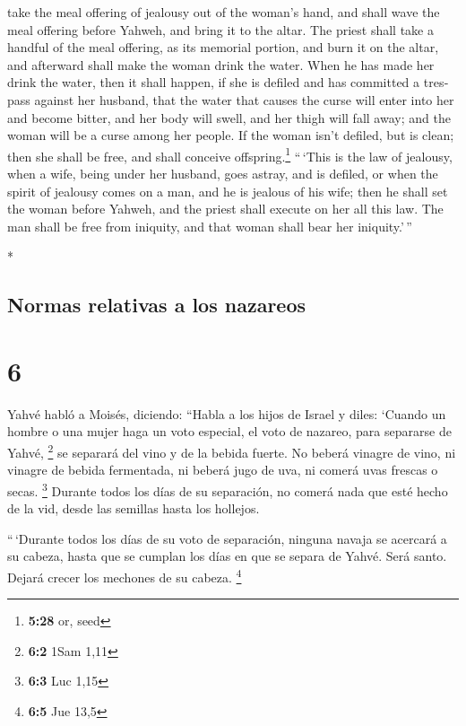 \begin{paracol}{2}
\begin{otherlanguage}{english}
take the meal offering of jealousy out of the woman's hand, and shall
wave the meal offering before Yahweh, and bring it to the altar.
 The priest shall take a handful of the meal offering, as
its memorial portion, and burn it on the altar, and afterward shall make
the woman drink the water.  When he has made her drink
the water, then it shall happen, if she is defiled and has committed a
trespass against her husband, that the water that causes the curse will
enter into her and become bitter, and her body will swell, and her thigh
will fall away; and the woman will be a curse among her people.
 If the woman isn't defiled, but is clean; then she shall
be free, and shall conceive offspring.\footnote{\textbf{5:28} or, seed}
 ``\,`This is the law of jealousy, when a wife, being
under her husband, goes astray, and is defiled,  or when
the spirit of jealousy comes on a man, and he is jealous of his wife;
then he shall set the woman before Yahweh, and the priest shall execute
on her all this law.  The man shall be free from
iniquity, and that woman shall bear her iniquity.'\,''

\end{otherlanguage}

\switchcolumn[0]*

\hypertarget{normas-relativas-a-los-nazareos}{%
\subsection{Normas relativas a los
nazareos}\label{normas-relativas-a-los-nazareos}}

\hypertarget{section-10}{%
\section{6}\label{section-10}}

 Yahvé habló a Moisés, diciendo:  ``Habla a
los hijos de Israel y diles: `Cuando un hombre o una mujer haga un voto
especial, el voto de nazareo, para separarse de Yahvé, \footnote{\textbf{6:2}
  1Sam 1,11}  se separará del vino y de la bebida fuerte.
No beberá vinagre de vino, ni vinagre de bebida fermentada, ni beberá
jugo de uva, ni comerá uvas frescas o secas. \footnote{\textbf{6:3} Luc
  1,15}  Durante todos los días de su separación, no
comerá nada que esté hecho de la vid, desde las semillas hasta los
hollejos.

 ``\,`Durante todos los días de su voto de separación,
ninguna navaja se acercará a su cabeza, hasta que se cumplan los días en
que se separa de Yahvé. Será santo. Dejará crecer los mechones de su
cabeza. \footnote{\textbf{6:5} Jue 13,5}


\end{paracol}
